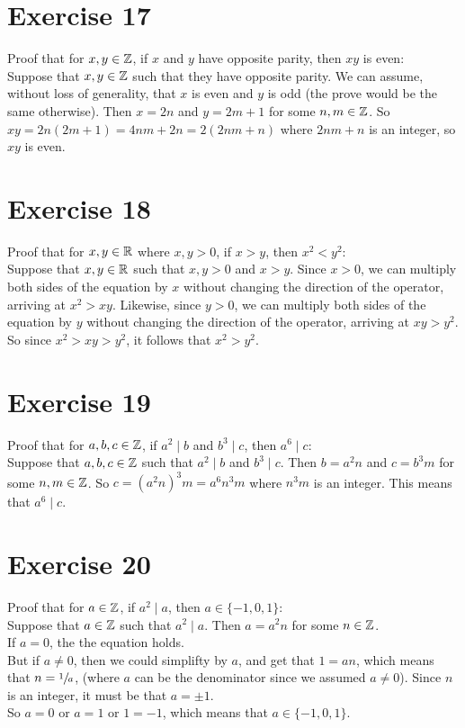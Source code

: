 \documentclass[12pt]{article}
\begin{document}
    \section*{Exercise 17}
    Proof that for $x, y \in \mathbb{Z}$,
    if $x$ and $y$ have opposite parity,
    then $xy$ is even: \\
    Suppose that $x, y \in \mathbb{Z}$
    such that they have opposite parity.
    We can assume, without loss of generality,
    that $x$ is even and $y$ is odd
    (the prove would be the same otherwise). 
    Then $x = 2n$ and $y=2m+1$ for some $n, m \in \mathbb{Z}$.
    So $xy = 2n(2m+1) = 4nm + 2n = 2(2nm + n)$
    where $2nm + n$ is an integer,
    so $xy$ is even. \\

    \section*{Exercise 18}
    Proof that for $x, y \in \mathbb{R}$ where $x, y > 0$,
    if $x > y$,
    then $x^2 < y^2$: \\
    Suppose that $x, y \in \mathbb{R}$
    such that $x, y > 0$ and $x > y$.
    Since $x > 0$,
    we can multiply both sides of the equation by $x$
    without changing the direction of the operator,
    arriving at $x^2 > xy$.
    Likewise, since $y > 0$,
    we can multiply both sides of the equation by $y$
    without changing the direction of the operator,
    arriving at $xy > y^2$.
    So since $x^2 > xy > y^2$,
    it follows that $x^2 > y^2$. \\
   
    \section*{Exercise 19}
    Proof that for $a, b, c \in \mathbb{Z}$,
    if $a^2 \mid b$ and $b^3 \mid c$,
    then $a^6 \mid c$: \\
    Suppose that $a, b, c \in \mathbb{Z}$
    such that $a^2 \mid b$ and $b^3 \mid c$.
    Then $b = a^2n$ and $c = b^3m$ for some $n, m \in \mathbb{Z}$.
    So $c = (a^2n)^3m = a^6n^3m$
    where $n^3m$ is an integer.
    This means that $a^6 \mid c$. \\

    \section*{Exercise 20}
    Proof that for $a \in \mathbb{Z}$,
    if $a^2 \mid a$, 
    then $a \in \{-1, 0, 1\}$: \\
    Suppose that $a \in \mathbb{Z}$
    such that $a^2 \mid a$.
    Then $a = a^2n$ for some $n \in \mathbb{Z}$. \\
    If $a = 0$, the the equation holds. \\
    But if $a \neq 0$,
    then we could simplifty by $a$,
    and get that $1 = an$,
    which means that $n = \sfrac{1}{a}$,
    (where $a$ can be the denominator since we assumed $a \neq 0$).
    Since $n$ is an integer,
    it must be that $a = \pm 1$. \\
    So $a = 0$ or $a = 1$ or $1 = -1$,
    which means that $a \in \{-1, 0, 1\}$. \\
\end{document}
